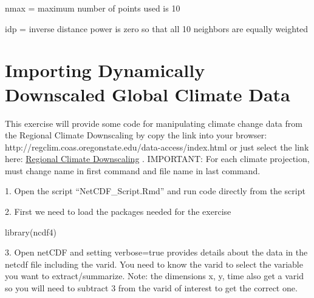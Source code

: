 \documentclass[
  letterpaper,
]{book}
\newenvironment{Shaded}{\begin{snugshade}}{\end{snugshade}}
\newcommand{\AttributeTok}[1]{\textcolor[rgb]{0.40,0.45,0.13}{#1}}
\newcommand{\CommentTok}[1]{\textcolor[rgb]{0.37,0.37,0.37}{#1}}
\newcommand{\ConstantTok}[1]{\textcolor[rgb]{0.56,0.35,0.01}{#1}}
\newcommand{\DecValTok}[1]{\textcolor[rgb]{0.68,0.00,0.00}{#1}}
\newcommand{\DocumentationTok}[1]{\textcolor[rgb]{0.37,0.37,0.37}{\textit{#1}}}
\newcommand{\FunctionTok}[1]{\textcolor[rgb]{0.28,0.35,0.67}{#1}}
\newcommand{\NormalTok}[1]{\textcolor[rgb]{0.00,0.23,0.31}{#1}}
\newcommand{\OtherTok}[1]{\textcolor[rgb]{0.00,0.23,0.31}{#1}}
\newcommand{\SpecialCharTok}[1]{\textcolor[rgb]{0.37,0.37,0.37}{#1}}
\newcommand{\StringTok}[1]{\textcolor[rgb]{0.13,0.47,0.30}{#1}}
\begin{document}
nmax = maximum number of points used is 10

idp = inverse distance power is zero so that all 10 neighbors are
equally weighted

\hypertarget{importing-dynamically-downscaled-global-climate-data}{%
\chapter{Importing Dynamically Downscaled Global Climate
Data}\label{importing-dynamically-downscaled-global-climate-data}}

This exercise will provide some code for manipulating climate change
data from the Regional Climate Downscaling by copy the link into your
browser: http://regclim.coas.oregonstate.edu/data-access/index.html or
just select the link here:
\href{http://regclim.coas.oregonstate.edu/data-access/index.html}{Regional
Climate Downscaling} . IMPORTANT: For each climate projection, must
change name in first command and file name in last command.

1. Open the script ``NetCDF\_Script.Rmd'' and run code directly from the
script

2. First we need to load the packages needed for the exercise

\begin{Shaded}
\begin{Highlighting}[]
\FunctionTok{library}\NormalTok{(ncdf4)}
\end{Highlighting}
\end{Shaded}

3. Open netCDF and setting verbose=true provides details about the data
in the netcdf file including the varid. You need to know the varid to
select the variable you want to extract/summarize. Note: the dimensions
x, y, time also get a varid so you will need to subtract 3 from the
varid of interest to get the correct one.

\begin{Shaded}
\end{Shaded}
\end{document}
